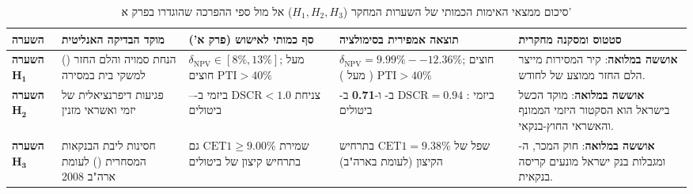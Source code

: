 \begin{table}[htbp]
\caption{סיכום ממצאי האימות הכמותי של השערות המחקר ($H_1, H_2, H_3$) אל מול ספי ההפרכה שהוגדרו בפרק א'}
\label{tab:hypotheses_validation_summary}
\centering
\small
\renewcommand{\arraystretch}{1.28}
\begin{tabularx}{\textwidth}{R{1.6cm} R{3.4cm} R{2.8cm} R{3.0cm} Y}
\toprule
{}
\textbf{השערה} & \textbf{מוקד הבדיקה האנליטית} & \textbf{סף כמותי לאישוש (פרק א')} & \textbf{תוצאה אמפירית בסימולציה} & \textbf{סטטוס ומסקנה מחקרית} \\
\midrule
\textbf{השערה $\mathbf{H_1}$} & הנחת  סמויה והלם החזר () למשקי בית במסירה & $\delta_{\text{NPV}} \in [8\%,13\%]$; מעל  חוצים $\text{PTI}>40\%$ & $\delta_{\text{NPV}}=9.99\%--12.36\%$; \textbf{} חוצים $\text{PTI}>40\%$ ( מעל ) & \textbf{\color{BrandTeal}אוששה במלואה}: קיר המסירות מייצר הלם החזר ממוצע של  לחודש. \\
\textbf{השערה $\mathbf{H_2}$} & פגיעות דיפרנציאלית של יזמי  ואשראי מזנין & צניחת $\text{DSCR}<1.0$ ביזמי  ב--- ביטולים & ביזמי : $\text{DSCR}=\mathbf{0.94}$ ב- ו-\textbf{\num{0.71}} ב- ביטולים & \textbf{\color{BrandTeal}אוששה במלואה}: מוקד הכשל בישראל הוא הסקטור היזמי הממונף והאשראי החוץ-בנקאי. \\
\textbf{השערה $\mathbf{H_3}$} & חסינות ליבת הבנקאות המסחרית () לעומת ארה"ב \num{2008} & שמירת $\text{CET1} \ge 9.00\%$ גם בתרחיש קיצון של  ביטולים & שפל של \textbf{$\text{CET1}=9.38\%$} בתרחיש הקיצון (לעומת  בארה"ב) & \textbf{\color{BrandTeal}אוששה במלואה}: חוק המכר, ה- ומגבלות בנק ישראל מונעים קריסה בנקאית. \\
\bottomrule
\end{tabularx}
\end{table}
